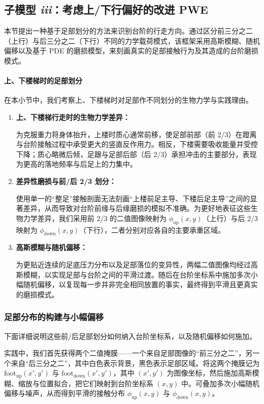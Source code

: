\documentclass[11pt,a4paper,fontset=windows]{ctexart}
\newcommand{\footup}{\mathrm{foot}_{\mathrm{up}}}
\newcommand{\footdown}{\mathrm{foot}_{\mathrm{down}}}
\begin{document}
\subsection{子模型 \textit{iii}：考虑上/下行偏好的改进 PWE}

本节提出一种基于足部划分的方法来识别台阶的行走方向。通过区分前三分之二（上行）与后三分之二（下行）不同的力学载荷模式，该框架采用高斯模糊、随机偏移以及基于 PDE 的磨损模型，来刻画真实的足部接触行为及其造成的台阶磨损模式。

\paragraph*{上、下楼梯时的足部划分}\quad 在本小节中，我们考察上、下楼梯时对足部作不同划分的生物力学与实践理由。

\begin{enumerate}
\item \textbf{上、下楼梯行走时的生物力学差异：}

为克服重力将身体抬升，上楼时质心通常前移，使足部前部（前 2/3）在蹬离与台阶接触过程中承受更大的竖直反作用力。相反，下楼需要吸收能量并受控下降；质心略微后倾，足跟与足部后部（后 2/3）承担冲击的主要部分，表现为更高的落地频率与后足上的力集中。

\item \textbf{差异性磨损与前/后 2/3 划分：}

使用单一的“整足”接触剖面无法刻画“上楼前足主导、下楼后足主导”之间的显著差异，从而导致对台阶前缘与后缘磨损的模拟不准确。为更好地表征这些生物力学差异，我们采用前 2/3 的二值图像映射为 $\phi_{\text{up}}(x,y)$（上行）与后 2/3 映射为 $\phi_{\text{down}}(x,y)$（下行），二者分别对应各自的主要承重区域。

\item \textbf{高斯模糊与随机偏移：}

为更贴近连续的足底压力分布以及足部落位的变异性，两幅二值图像均经过高斯模糊，以实现足部与台阶之间的平滑过渡。随后在台阶坐标系中施加多次小幅随机偏移，以复现每一步并非完全相同放置的事实，最终得到平滑且更真实的磨损模式。
\end{enumerate}

\subsubsection{足部分布的构建与小幅偏移}

下面详细说明这些前/后足部划分如何纳入台阶坐标系，以及随机偏移如何施加。

实践中，我们首先获得两个二值掩膜——一个来自足部图像的“前三分之二”，另一个来自“后三分之二”，其中白色表示背景，黑色表示足部区域。将这两个掩膜记为 $\footup(x',y')$ 与 $\footdown(x',y')$，其中 $(x',y')$ 为图像坐标，然后施加高斯模糊、缩放与位置拟合，把它们映射到台阶坐标系 $(x,y)$ 中。可叠加多次小幅随机偏移与噪声，从而得到平滑的接触分布 $\phi_{\text{up}}(x,y)$ 与 $\phi_{\text{down}}(x,y)$。
\end{document}
